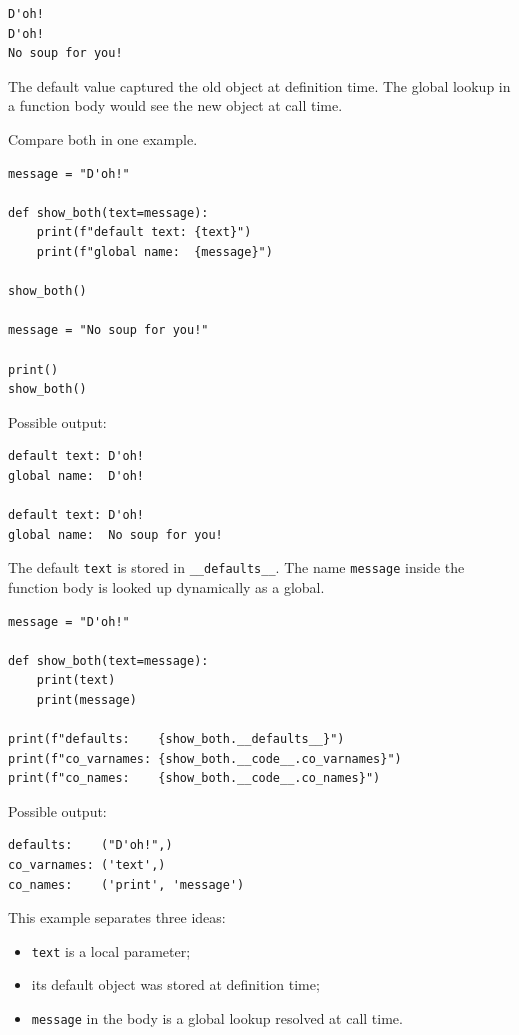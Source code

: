 \begin{verbatim}
D'oh!
D'oh!
No soup for you!
\end{verbatim}

The default value captured the old object at definition time. The global lookup in a function body would see the new object at call time.

Compare both in one example.

\begin{verbatim}
message = "D'oh!"

def show_both(text=message):
    print(f"default text: {text}")
    print(f"global name:  {message}")

show_both()

message = "No soup for you!"

print()
show_both()
\end{verbatim}

Possible output:

\begin{verbatim}
default text: D'oh!
global name:  D'oh!

default text: D'oh!
global name:  No soup for you!
\end{verbatim}

The default \texttt{text} is stored in \texttt{\_\_defaults\_\_}. The name \texttt{message} inside the function body is looked up dynamically as a global.

\begin{verbatim}
message = "D'oh!"

def show_both(text=message):
    print(text)
    print(message)

print(f"defaults:    {show_both.__defaults__}")
print(f"co_varnames: {show_both.__code__.co_varnames}")
print(f"co_names:    {show_both.__code__.co_names}")
\end{verbatim}

Possible output:

\begin{verbatim}
defaults:    ("D'oh!",)
co_varnames: ('text',)
co_names:    ('print', 'message')
\end{verbatim}

This example separates three ideas:

\begin{itemize}
    \item \texttt{text} is a local parameter;
    \item its default object was stored at definition time;
    \item \texttt{message} in the body is a global lookup resolved at call time.
\end{itemize}

